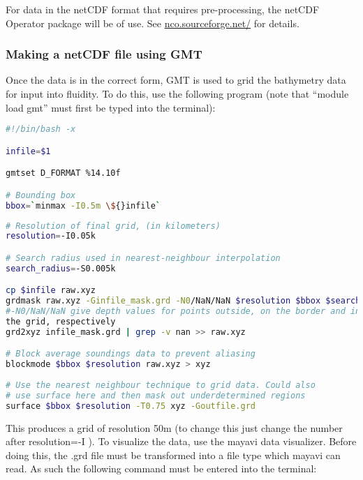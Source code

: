 For data in the netCDF format that requires pre-processing, the netCDF Operator package will be of use. See
\href{http://nco.sourceforge.net/}{nco.sourceforge.net/} for details. 

\subsubsection{Making a netCDF file using GMT}

Once the data is in the correct form, GMT is used to grid the bathymetry data for input into 
fluidity. To do this, use the following program (note that “module load 
gmt” must first be typed into the terminal):

\begin{lstlisting}[language = Bash]
#!/bin/bash -x 

infile=$1 

gmtset D_FORMAT %14.10f 

# Bounding box 
bbox=`minmax -I0.5m \${}infile` 

\end{lstlisting}
\begin{lstlisting}[language = Bash]
# Resolution of final grid, (in kilometers) 
resolution=-I0.05k 

# Search radius used in nearest-neighbour interpolation 
search_radius=-S0.005k 

cp $infile raw.xyz 
grdmask raw.xyz -Ginfile_mask.grd -N0/NaN/NaN $resolution $bbox $search_radius   
#-N0/NaN/NaN give depth values for points outside, on the border and inside 
the grid, respectively
grd2xyz infile_mask.grd | grep -v nan >> raw.xyz 

# Block average soundings data to prevent aliasing 
blockmode $bbox $resolution raw.xyz > xyz 
     
# Use the nearest neighbour technique to grid data. Could also 
# use surface here and then mask out underdetermined regions 
surface $bbox $resolution -T0.75 xyz -Goutfile.grd 
\end{lstlisting}

This produces a grid of resolution 50m (to change this just change the number after 
resolution=-I ). To visualize the data, use the mayavi data visualizer. Before doing this, 
the .grd file must be transformed into a file type which mayavi can read. As such the following 
command must be entered into the terminal:

